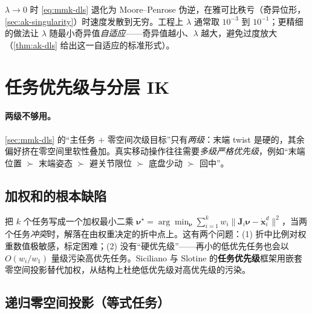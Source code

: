 \begin{pitfall}
$\lambda\to0$ 时 \cref{eq:mmk-dls} 退化为 Moore--Penrose 伪逆，在雅可比秩亏（奇异位形，\cref{sec:ak-singularity}）时速度发散到无穷。工程上 $\lambda$ 通常取 $10^{-3}$ 到 $10^{-1}$；更精细的做法让 $\lambda$ 随最小奇异值\emph{自适应}——奇异值越小、$\lambda$ 越大，避免过度放大（\cref{thm:ak-dls} 给出这一自适应的标准形式）。
\end{pitfall}

\section{任务优先级与分层 IK}
\label{sec:mmk-priority}

\paragraph{两级不够用。}
\cref{sec:mmk-dls} 的“主任务 $+$ 零空间次级目标”只有\emph{两级}：末端 twist 是硬的，其余偏好挤在零空间里软性叠加。真实移动操作往往需要\emph{多级严格优先级}，例如“末端位置 $\succ$ 末端姿态 $\succ$ 避关节限位 $\succ$ 底盘少动 $\succ$ 回中”。

\subsection{加权和的根本缺陷}
\label{sec:mmk-weighted}

把 $k$ 个任务写成一个加权最小二乘 $\boldsymbol{\nu}^\star=\arg\min_{\boldsymbol{\nu}}\sum_{i=1}^k w_i\|\mathbf{J}_i\boldsymbol{\nu}-\dot{\mathbf{x}}_i^d\|^2$，当两个任务\emph{冲突}时，解落在由权重决定的折中点上。这有两个问题：(1) 折中比例对权重数值极敏感，标定困难；(2) 没有“硬优先级”——再小的低优先任务也会以 $O(w_i/w_1)$ 量级污染高优先任务。Siciliano 与 Slotine 的\textbf{任务优先级}框架用嵌套零空间投影替代加权，从结构上杜绝低优先级对高优先级的污染。

\subsection{递归零空间投影（等式任务）}
\label{sec:mmk-recursive}

